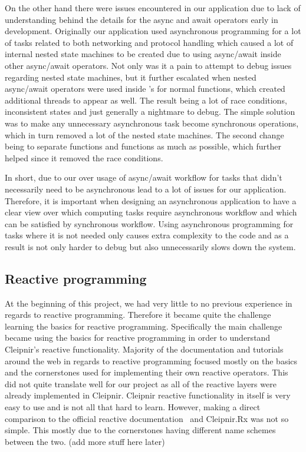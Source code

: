 On the other hand there were issues encountered in our application due to lack of understanding behind the details for the async and await operators early in development. Originally our application used asynchronous programming for a lot of tasks related to both networking and protocol handling which caused a lot of internal nested state machines to be created due to using async/await inside other async/await operators. Not only was it a pain to attempt to debug issues regarding nested state machines, but it further escalated when nested async/await operators were used inside 's for normal  functions, which created additional threads to appear as well. The result being a lot of race conditions, inconsistent states and just generally a nightmare to debug. The simple solution was to make any unnecessary asynchronous task become synchronous operations, which in turn removed a lot of the nested state machines. The second change being to separate  functions and  functions as much as possible, which further helped since it removed the race conditions.

In short, due to our over usage of async/await workflow for tasks that didn't necessarily need to be asynchronous lead to a lot of issues for our application. Therefore, it is important when designing an asynchronous application to have a clear view over which computing tasks require asynchronous workflow and which can be satisfied by synchronous workflow. Using asynchronous programming for tasks where it is not needed only causes extra complexity to the code and as a result is not only harder to debug but also unnecessarily slows down the system.

\subsection{Reactive programming}
At the beginning of this project, we had very little to no previous experience in regards to reactive programming. Therefore it became quite the challenge learning the basics for reactive programming. Specifically the main challenge became using the basics for reactive programming in order to understand Cleipnir's reactive functionality. Majority of the documentation and tutorials around the web in regards to reactive programming focused mostly on the basics and the cornerstones used for implementing their own reactive operators. This did not quite translate well for our project as all of the reactive layers were already implemented in Cleipnir. Cleipnir reactive functionality in itself is very easy to use and is not all that hard to learn. However, making a direct comparison to the official reactive documentation~\cite{WEB:ReactiveXMainPage} and Cleipnir.Rx was not so simple. This mostly due to the cornerstones having different name schemes between the two.  (add more stuff here later)

